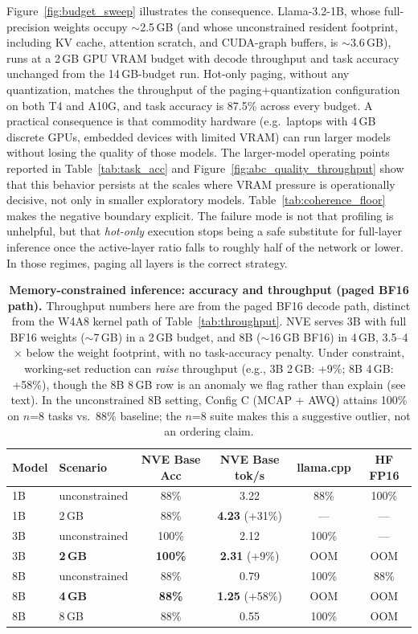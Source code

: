 \documentclass{article}
\begin{document}
Figure~\ref{fig:budget_sweep} illustrates the consequence. Llama-3.2-1B,
whose full-precision weights occupy $\sim$2.5\,GB (and whose unconstrained
resident footprint, including KV cache, attention scratch, and CUDA-graph
buffers, is $\sim$3.6\,GB), runs at a 2\,GB GPU VRAM budget with decode
throughput and task accuracy unchanged from the 14\,GB-budget run. Hot-only
paging, without any quantization, matches the throughput of the
paging+quantization configuration on both T4 and A10G, and task accuracy is
87.5\% across every budget. A practical consequence is that commodity
hardware (e.g.\ laptops with 4\,GB discrete GPUs, embedded devices with
limited VRAM) can run larger models without losing the quality of those
models.
The larger-model operating points reported in Table~\ref{tab:task_acc} and
Figure~\ref{fig:abc_quality_throughput} show that this behavior persists at the scales
where VRAM pressure is operationally decisive, not only in smaller exploratory models.
Table~\ref{tab:coherence_floor} makes the negative boundary explicit. The failure mode is
not that profiling is unhelpful, but that \emph{hot-only} execution stops being a safe
substitute for full-layer inference once the active-layer ratio falls to roughly half of
the network or lower. In those regimes, paging all layers is the correct strategy.

\begin{table}[H]
\centering
\caption{\textbf{Memory-constrained inference: accuracy and throughput (paged BF16 path).}
Throughput numbers here are from the paged BF16 decode path, distinct from the W4A8
kernel path of Table~\ref{tab:throughput}. NVE serves 3B with full BF16 weights
($\sim$7\,GB) in a 2\,GB budget, and 8B ($\sim$16\,GB BF16) in 4\,GB, 3.5--4$\times$
below the weight footprint, with no task-accuracy penalty. Under constraint, working-set
reduction can \emph{raise} throughput (e.g., 3B 2\,GB: +9\%; 8B 4\,GB: +58\%), though the
8B 8\,GB row is an anomaly we flag rather than explain (see text). In the unconstrained
8B setting, Config C (MCAP + AWQ) attains 100\% on $n$=8 tasks vs.\ 88\% baseline; the
$n$=8 suite makes this a suggestive outlier, not an ordering claim.}
\label{tab:memory_constrained}
\small
\begin{tabular}{llcccc}
\toprule
Model & Scenario & NVE Base Acc & NVE Base tok/s & llama.cpp & HF FP16 \\
\midrule
1B & unconstrained & 88\% & 3.22 & 88\% & 100\% \\
1B & 2\,GB & 88\% & \textbf{4.23} (+31\%) & --- & --- \\
\midrule
3B & unconstrained & 100\% & 2.12 & 100\% & --- \\
\rowcolor{w4a8color!15}
3B & \textbf{2\,GB} & \textbf{100\%} & \textbf{2.31} (+9\%) & OOM & OOM \\
\midrule
8B & unconstrained & 88\% & 0.79 & 100\% & 88\% \\
\rowcolor{w4a8color!15}
8B & \textbf{4\,GB} & \textbf{88\%} & \textbf{1.25} (+58\%) & OOM & OOM \\
8B & 8\,GB & 88\% & 0.55 & 100\% & OOM \\
\bottomrule
\end{tabular}
\end{table}
\end{document}
